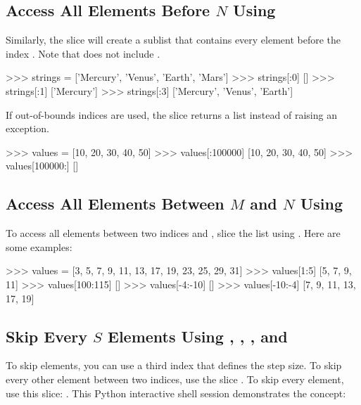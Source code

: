 \documentclass[11pt]{cselabheader}
\begin{document}
\subsection{\texorpdfstring%
  {Access All Elements Before $N$ Using \pythoninline{[:N]}}
  {Access All Elements Before N Using {[}:N{]}}}
Similarly, the slice  will create a sublist
that contains every element before the index .
Note that  does not include .

\begin{pyconcode}
>>> strings = ['Mercury', 'Venus', 'Earth', 'Mars']
>>> strings[:0]
[]
>>> strings[:1]
['Mercury']
>>> strings[:3]
['Mercury', 'Venus', 'Earth']

\end{pyconcode}

If out-of-bounds indices are used, the slice returns
a list instead of raising an exception.

\begin{pyconcode}
>>> values = [10, 20, 30, 40, 50]
>>> values[:100000]
[10, 20, 30, 40, 50]
>>> values[100000:]
[]

\end{pyconcode}

\subsection{\texorpdfstring%
  {Access All Elements Between $M$ and $N$ Using \pythoninline{[M:N]}}
  {Access All Elements Between M and N Using {[}M:N{]}}}
To access all elements between two indices  and
, slice the list using .
Here are some examples:

\begin{pyconcode}
>>> values = [3, 5, 7, 9, 11, 13, 17, 19, 23, 25, 29, 31]
>>> values[1:5]
[5, 7, 9, 11]
>>> values[100:115]
[]
>>> values[-4:-10]
[]
>>> values[-10:-4]
[7, 9, 11, 13, 17, 19]

\end{pyconcode}

\subsection{Skip Every $S$ Elements Using \pythoninline{[M:N:S]},
  \pythoninline{[:N:S]}, \pythoninline{[M::S]}, and \pythoninline{[::S]}}

To skip elements, you can use a third index 
that defines the step size. To skip every other element between two
indices, use the slice .
To skip every  element, use this slice: .
This Python interactive shell session demonstrates the concept:
\end{document}
